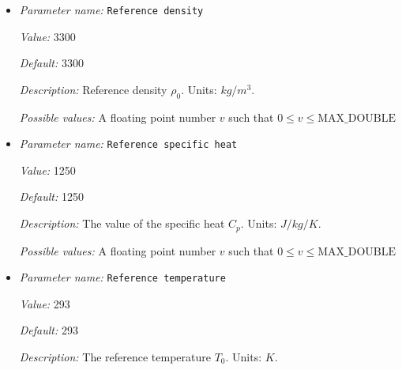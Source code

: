 \begin{itemize}
{\it Default:} 


{\it Description:} A list of widths for each phase transition, in terms of depth. The phase functions are scaled with these values, leading to a jump between phases for a value of zero and a gradual transition for larger values. List must have the same number of entries as Phase transition depths. Units: $m$.


{\it Possible values:} A list of 0 to 4294967295 elements where each element is [A floating point number $v$ such that $0 \leq v \leq \text{MAX\_DOUBLE}$]
\item {\it Parameter name:} {\tt Reference density}
\label{parameters:Material model/Latent heat/Reference density}
\label{parameters:Material_20model/Latent_20heat/Reference_20density}


{\it Value:} 3300


{\it Default:} 3300


{\it Description:} Reference density $\rho_0$. Units: $kg/m^3$.


{\it Possible values:} A floating point number $v$ such that $0 \leq v \leq \text{MAX\_DOUBLE}$
\item {\it Parameter name:} {\tt Reference specific heat}
\label{parameters:Material model/Latent heat/Reference specific heat}
\label{parameters:Material_20model/Latent_20heat/Reference_20specific_20heat}


{\it Value:} 1250


{\it Default:} 1250


{\it Description:} The value of the specific heat $C_p$. Units: $J/kg/K$.


{\it Possible values:} A floating point number $v$ such that $0 \leq v \leq \text{MAX\_DOUBLE}$
\item {\it Parameter name:} {\tt Reference temperature}
\label{parameters:Material model/Latent heat/Reference temperature}
\label{parameters:Material_20model/Latent_20heat/Reference_20temperature}


{\it Value:} 293


{\it Default:} 293


{\it Description:} The reference temperature $T_0$. Units: $K$.



\end{itemize}
